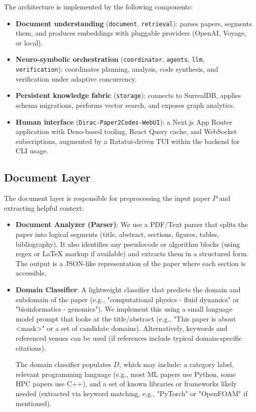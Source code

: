 \documentclass{ieeeaccess}
\begin{document}
The architecture is implemented by the following components:
\begin{itemize}
\item \textbf{Document understanding} (\texttt{document}, \texttt{retrieval}): parses papers, segments them, and produces embeddings with pluggable providers (OpenAI, Voyage, or local).
\item \textbf{Neuro-symbolic orchestration} (\texttt{coordinator}, \texttt{agents}, \texttt{llm}, \texttt{verification}): coordinates planning, analysis, code synthesis, and verification under adaptive concurrency.
\item \textbf{Persistent knowledge fabric} (\texttt{storage}): connects to SurrealDB, applies schema migrations, performs vector search, and exposes graph analytics.
\item \textbf{Human interface} (\texttt{Dirac-Paper2Codes-WebUI}): a Next.js App Router application with Deno-based tooling, React Query cache, and WebSocket subscriptions, augmented by a Ratatui-driven TUI within the backend for CLI usage.
\end{itemize}

\subsection{Document Layer}
The document layer is responsible for preprocessing the input paper $P$ and extracting helpful context:
\begin{itemize}
\item \textbf{Document Analyzer (Parser)}: We use a PDF/Text parser that splits the paper into logical segments (title, abstract, sections, figures, tables, bibliography). It also identifies any pseudocode or algorithm blocks (using regex or LaTeX markup if available) and extracts them in a structured form. The output is a JSON-like representation of the paper where each section is accessible.
\item \textbf{Domain Classifier}: A lightweight classifier that predicts the domain and subdomain of the paper (e.g., "computational physics - fluid dynamics" or "bioinformatics - genomics"). We implement this using a small language model prompt that looks at the title/abstract (e.g., "This paper is about <mask>" or a set of candidate domains). Alternatively, keywords and referenced venues can be used (if references include typical domain-specific citations).

The domain classifier populates $D$, which may include: a category label, relevant programming language (e.g., most ML papers use Python, some HPC papers use C++), and a set of known libraries or frameworks likely needed (extracted via keyword matching, e.g., "PyTorch" or "OpenFOAM" if mentioned).


\end{itemize}
\end{document}
